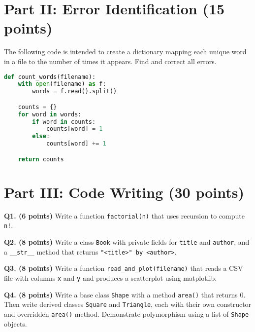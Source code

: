\documentclass[12pt]{article}
\begin{document}
\newpage
\section*{Part II: Error Identification (15 points)}

The following code is intended to create a dictionary mapping each unique word in a file to the number of times it appears. Find and correct all errors.

\begin{lstlisting}[language=Python]
def count_words(filename):
    with open(filename) as f:
        words = f.read().split()

    counts = {}
    for word in words:
        if word in counts:
            counts[word] = 1
        else:
            counts[word] += 1

    return counts
\end{lstlisting}

\vspace{3in} %

\newpage
\section*{Part III: Code Writing (30 points)}

\textbf{Q1. (6 points)}  
Write a function \texttt{factorial(n)} that uses recursion to compute \texttt{n!}.

\vspace{2in}

\textbf{Q2. (8 points)}  
Write a class \texttt{Book} with private fields for \texttt{title} and \texttt{author}, and a \texttt{\_\_str\_\_} method that returns \texttt{"<title>" by <author>}.

\vspace{2.5in}

\textbf{Q3. (8 points)}  
Write a function \texttt{read\_and\_plot(filename)} that reads a CSV file with columns \texttt{x} and \texttt{y} and produces a scatterplot using matplotlib.

\vspace{2.5in}

\textbf{Q4. (8 points)}  
Write a base class \texttt{Shape} with a method \texttt{area()} that returns 0. Then write derived classes \texttt{Square} and \texttt{Triangle}, each with their own constructor and overridden \texttt{area()} method. Demonstrate polymorphism using a list of \texttt{Shape} objects.

\vspace{3in}
\end{document}
